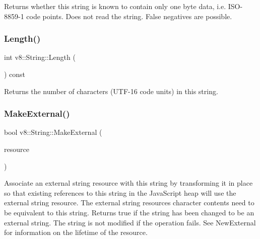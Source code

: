 Returns whether this string is known to contain only one byte data, i.\+e. I\+S\+O-\/8859-\/1 code points. Does not read the string. False negatives are possible. \mbox{\label{classv8_1_1String_afaa18eae27056bb7058f09920a238f53}} 
\subsubsection{\texorpdfstring{Length()}{Length()}}
{\footnotesize\ttfamily int v8\+::\+String\+::\+Length (\begin{DoxyParamCaption}{ }\end{DoxyParamCaption}) const}

Returns the number of characters (U\+T\+F-\/16 code units) in this string. \mbox{\label{classv8_1_1String_a5efd1eba40c1fa8a6aae2c4a175a63be}} 
\subsubsection{\texorpdfstring{Make\+External()}{MakeExternal()}\hspace{0.1cm}{\footnotesize\ttfamily [1/2]}}
{\footnotesize\ttfamily bool v8\+::\+String\+::\+Make\+External (\begin{DoxyParamCaption}\item[{\mbox{\hyperlink{classv8_1_1String_1_1ExternalStringResource}{External\+String\+Resource}} $\ast$}]{resource }\end{DoxyParamCaption})}

Associate an external string resource with this string by transforming it in place so that existing references to this string in the Java\+Script heap will use the external string resource. The external string resource\textquotesingle{}s character contents need to be equivalent to this string. Returns true if the string has been changed to be an external string. The string is not modified if the operation fails. See New\+External for information on the lifetime of the resource. \mbox{\label{classv8_1_1String_a607d632c720eec5133649f522aefa944}} 
